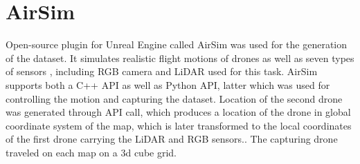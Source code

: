 \documentclass[twoside]{ctuthesis}
\theoremstyle{plain}
\theoremstyle{definition}
\theoremstyle{note}
\begin{document}
\section{AirSim}
Open-source plugin for Unreal Engine called AirSim was used for the generation of the dataset. It simulates realistic flight motions of drones as well as seven types of sensors , including RGB camera and LiDAR used for this task. AirSim supports both a C++ API as well as Python API, latter which was used for controlling the motion and capturing the dataset. Location of the second drone was generated through API call, which produces a location of the drone in global coordinate system of the map, which is later transformed to the local coordinates of the first drone carrying the LiDAR and RGB sensors.. The capturing drone traveled on each map on a 3d cube grid.
\end{document}
